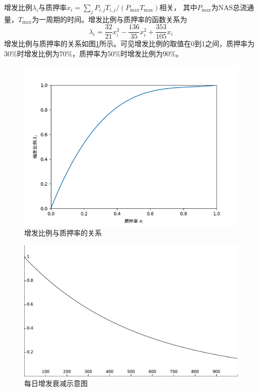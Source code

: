 增发比例\(\lambda_i\)与质押率\(x_i = \sum_j P_{i,j} T_{i,j}/(P_\text{max}T_\text{max})\)相关，
其中\(P_\text{max}\)为NAS总流通量，\(T_\text{max}\)为一周期的时间。增发比例与质押率的函数关系为
  \begin{equation}
    \lambda_i = \frac{32}{21} x_i^3 - \frac{136}{35} x_i^2 + \frac{353}{105} x_i
  \end{equation}
  增发比例与质押率的关系如图\ref{func}所示。可见增发比例的取值在0到1之间，质押率为30\%时增发比例为70\%，质押率为50\%时增发比例为90\%。
 \begin{figure}
   \centering
   \includegraphics[scale=0.4]{../common/fx.png}
   \caption{增发比例与质押率的关系}\label{func}
 \end{figure}
 \begin{figure}
   \centering
   \includegraphics[scale=0.4]{../common/ch/everyday.pdf}
   \caption{每日增发衰减示意图}
 \end{figure}
